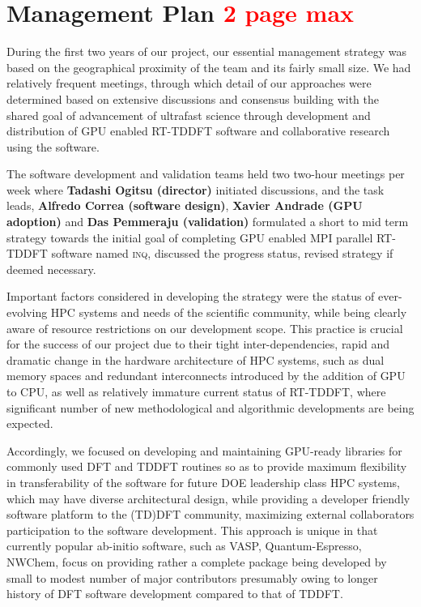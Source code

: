 \section{Management Plan \textcolor{red}{2 page max}}
\label{sec:manage}

During the first two years of our project, our essential management strategy was based on the geographical proximity of the team and its fairly small size. We had relatively frequent meetings, through which detail of our approaches were determined based on extensive discussions and consensus building with the shared goal of advancement of ultrafast science through development and distribution of GPU enabled RT-TDDFT software and collaborative research using the software. 

The software development and validation teams held two two-hour meetings per week where {\bf Tadashi Ogitsu (director)} initiated discussions, and the task leads, {\bf Alfredo Correa (software design)}, {\bf Xavier Andrade (GPU adoption)} and {\bf Das Pemmeraju (validation)} formulated a short to mid term strategy towards the initial goal of completing GPU enabled MPI parallel RT-TDDFT software named \textsc{inq}, discussed the progress status, revised strategy if deemed necessary.

Important factors considered in developing the strategy were the status of ever-evolving HPC systems and needs of the scientific community, while being clearly aware of resource restrictions on our development scope. 
This practice is crucial for the success of our project due to their tight inter-dependencies, rapid and dramatic change in the hardware architecture of HPC systems, such as dual memory spaces and redundant interconnects introduced by the addition of GPU to CPU, as well as relatively immature current status of RT-TDDFT, where significant number of new methodological and algorithmic developments are being expected. 

Accordingly, we focused on developing and maintaining GPU-ready libraries for commonly used DFT and TDDFT routines so as to provide maximum flexibility in transferability of the software for future DOE leadership class HPC systems, which may have diverse architectural design, while providing a developer friendly software platform to the (TD)DFT community, maximizing external collaborators participation to the software development. 
This approach is unique in that currently popular ab-initio software, such as VASP, Quantum-Espresso, NWChem, focus on providing rather a complete package being developed by small to modest number of major contributors presumably owing to longer history of DFT software development compared to that of TDDFT.


